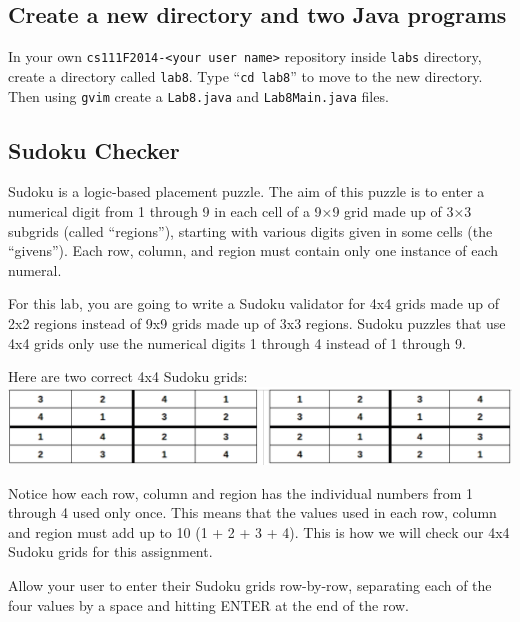\vspace{-0.1in}
\subsection*{Create a new directory and two Java programs}
\vspace{-0.05in}
In your own {\tt cs111F2014-<your user name>} repository inside {\tt labs} directory, create a directory called {\tt lab8}. Type ``{\tt cd lab8}'' to move to the new directory. Then using {\tt gvim} create a {\tt Lab8.java} and {\tt Lab8Main.java} files.

\vspace{-0.1in}
\subsection*{Sudoku Checker}
\vspace{-0.05in}
Sudoku is a logic-based placement puzzle. The aim of this puzzle is to enter a numerical digit from 1 through 9 in each cell of a 9×9 grid made up of 3×3 subgrids (called ``regions''), starting with various digits given in some cells (the ``givens''). Each row, column, and region must contain only one instance of each numeral.

\noindent For this lab, you are going to write a Sudoku validator for 4x4 grids made up of 2x2 regions instead of 9x9 grids made up of 3x3 regions.  Sudoku puzzles that use 4x4 grids only use the numerical digits 1 through 4 instead of 1 through 9.

\noindent Here are two correct 4x4 Sudoku grids:\\
\includegraphics[scale=0.3]{grids}

\noindent Notice how each row, column and region has the individual numbers from 1 through 4 used only once.  This means that the values used in each row, column and region must add up to 10 (1 + 2 + 3 + 4).  This is how we will check our 4x4 Sudoku grids for this assignment.

\noindent Allow your user to enter their Sudoku grids row-by-row, separating each of the four values by a space and hitting ENTER at the end of the row.

